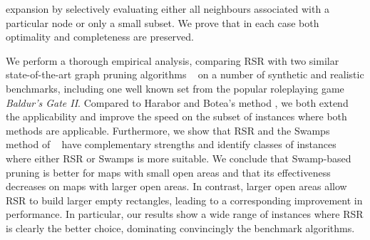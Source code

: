 expansion by selectively evaluating either all neighbours associated with a
particular node or only a small subset.  We prove that in each case both
optimality and completeness are preserved.
\par
We perform a thorough empirical analysis, comparing RSR with two similar
state-of-the-art graph pruning algorithms ~\cite{pochter10,harabor10} on a
number of synthetic and realistic benchmarks, including one well known set from
the popular roleplaying game \emph{Baldur's Gate II}.  Compared to Harabor and
Botea's method \cite{harabor10}, we both extend the applicability and improve
the speed on the subset of instances where both methods are applicable.
Furthermore, we show that RSR and the Swamps method of ~\cite{pochter10}
have complementary strengths and identify classes of instances where either RSR
or Swamps is more suitable.  We conclude that Swamp-based pruning is better
for maps with small open areas and that its effectiveness decreases on maps
with larger open areas.  In contrast, larger open areas allow RSR to build
larger empty rectangles, leading to a corresponding improvement in performance.
In particular, our results show a wide range of instances where RSR is clearly
the better choice, dominating convincingly the benchmark algorithms.

